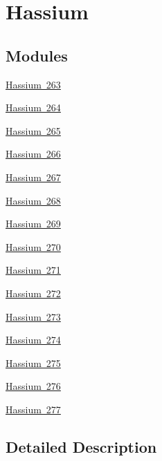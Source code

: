 \hypertarget{group___isotope_const-_hassium}{}\section{Hassium}
\label{group___isotope_const-_hassium}
\subsection*{Modules}
\begin{DoxyCompactItemize}
\item 
\mbox{\hyperlink{group___isotope_const-_hassium-_hs263}{Hassium 263}}
\item 
\mbox{\hyperlink{group___isotope_const-_hassium-_hs264}{Hassium 264}}
\item 
\mbox{\hyperlink{group___isotope_const-_hassium-_hs265}{Hassium 265}}
\item 
\mbox{\hyperlink{group___isotope_const-_hassium-_hs266}{Hassium 266}}
\item 
\mbox{\hyperlink{group___isotope_const-_hassium-_hs267}{Hassium 267}}
\item 
\mbox{\hyperlink{group___isotope_const-_hassium-_hs268}{Hassium 268}}
\item 
\mbox{\hyperlink{group___isotope_const-_hassium-_hs269}{Hassium 269}}
\item 
\mbox{\hyperlink{group___isotope_const-_hassium-_hs270}{Hassium 270}}
\item 
\mbox{\hyperlink{group___isotope_const-_hassium-_hs271}{Hassium 271}}
\item 
\mbox{\hyperlink{group___isotope_const-_hassium-_hs272}{Hassium 272}}
\item 
\mbox{\hyperlink{group___isotope_const-_hassium-_hs273}{Hassium 273}}
\item 
\mbox{\hyperlink{group___isotope_const-_hassium-_hs274}{Hassium 274}}
\item 
\mbox{\hyperlink{group___isotope_const-_hassium-_hs275}{Hassium 275}}
\item 
\mbox{\hyperlink{group___isotope_const-_hassium-_hs276}{Hassium 276}}
\item 
\mbox{\hyperlink{group___isotope_const-_hassium-_hs277}{Hassium 277}}
\end{DoxyCompactItemize}


\subsection{Detailed Description}
